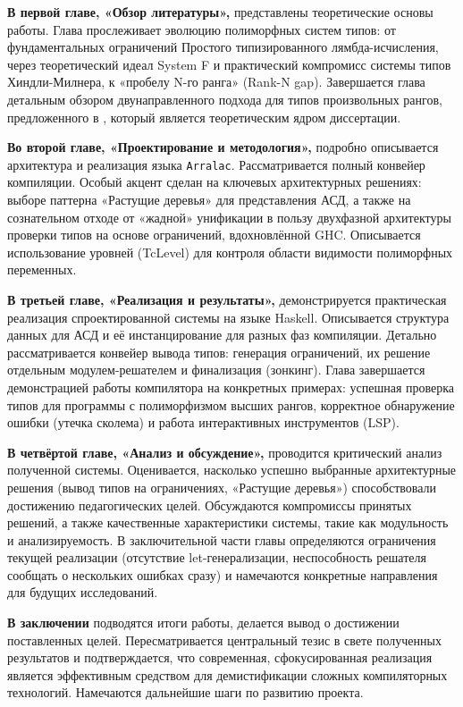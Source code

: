 \textbf{В первой главе, «Обзор литературы»,} представлены теоретические основы работы. Глава прослеживает эволюцию полиморфных систем типов: от фундаментальных ограничений Простого типизированного лямбда-исчисления, через теоретический идеал System F и практический компромисс системы типов Хиндли-Милнера, к «пробелу N-го ранга» (Rank-N gap). Завершается глава детальным обзором двунаправленного подхода для типов произвольных рангов, предложенного в \cite{jones-practical-2007}, который является теоретическим ядром диссертации.

\textbf{Во второй главе, «Проектирование и методология»,} подробно описывается архитектура и реализация языка \texttt{Arralac}. Рассматривается полный конвейер компиляции. Особый акцент сделан на ключевых архитектурных решениях: выборе паттерна «Растущие деревья» для представления АСД, а также на сознательном отходе от «жадной» унификации в пользу двухфазной архитектуры проверки типов на основе ограничений, вдохновлённой GHC. Описывается использование уровней (TcLevel) для контроля области видимости полиморфных переменных.

\textbf{В третьей главе, «Реализация и результаты»,} демонстрируется практическая реализация спроектированной системы на языке Haskell. Описывается структура данных для АСД и её инстанцирование для разных фаз компиляции. Детально рассматривается конвейер вывода типов: генерация ограничений, их решение отдельным модулем-решателем и финализация (зонкинг). Глава завершается демонстрацией работы компилятора на конкретных примерах: успешная проверка типов для программы с полиморфизмом высших рангов, корректное обнаружение ошибки (утечка сколема) и работа интерактивных инструментов (LSP).

\textbf{В четвёртой главе, «Анализ и обсуждение»,} проводится критический анализ полученной системы. Оценивается, насколько успешно выбранные архитектурные решения (вывод типов на ограничениях, «Растущие деревья») способствовали достижению педагогических целей. Обсуждаются компромиссы принятых решений, а также качественные характеристики системы, такие как модульность и анализируемость. В заключительной части главы определяются ограничения текущей реализации (отсутствие let-генерализации, неспособность решателя сообщать о нескольких ошибках сразу) и намечаются конкретные направления для будущих исследований.

\textbf{В заключении} подводятся итоги работы, делается вывод о достижении поставленных целей. Пересматривается центральный тезис в свете полученных результатов и подтверждается, что современная, сфокусированная реализация является эффективным средством для демистификации сложных компиляторных технологий. Намечаются дальнейшие шаги по развитию проекта.